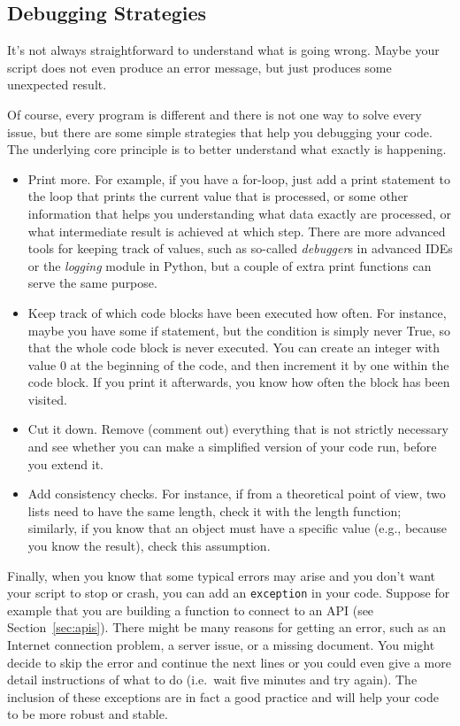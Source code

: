 \subsection{Debugging Strategies}\label{sec:debugging}

It's not always straightforward to understand what is going
wrong. Maybe your script does not even produce an error
message, but just produces some unexpected result.

Of course, every program is different and there is not one
way to solve every issue, but there are some simple strategies
that help you debugging your code. The underlying core
principle is to better understand what exactly is happening.

\begin{itemize}
  \item Print more. For example, if you have a for-loop, just add a print statement to the loop that prints the current value that is processed, or some other information that helps you understanding what data exactly are processed, or what intermediate result is achieved at which step. There are more advanced tools for keeping track of values, such as so-called \emph{debugger}s in advanced IDEs or the \emph{logging} module in Python, but a couple of extra print functions can serve the same purpose.
  \item Keep track of which code blocks have been executed how often. For instance, maybe you have some if statement, but the condition is simply never True, so that the whole code block is never executed. You can create an integer with value 0 at the beginning of the code, and then increment it by one within the code block. If you print it afterwards, you know how often the block has been visited.
  \item Cut it down. Remove (comment out) everything that is not strictly necessary and see whether you can make a simplified version of your code run, before you extend it.
  \item Add consistency checks. For instance, if from a theoretical point of view, two lists need to have the same length, check it with the length function; similarly, if you know that an object must have a specific value (e.g., because you know the result), check this assumption.
\end{itemize}


Finally, when you know that some typical errors may arise and you don't want your script to stop or crash, you can add an \texttt{exception} in your code. Suppose for example that you are building a function to connect to an API (see Section~\ref{sec:apis}). There might be many reasons for getting an error, such as an Internet connection problem, a server issue, or a missing document. You might decide to skip  the error and continue the next lines or  you could even give a more detail instructions of what to do (i.e.\ wait five minutes and try again). The inclusion of these exceptions are in fact a good practice and will help your code to be more robust and stable.

